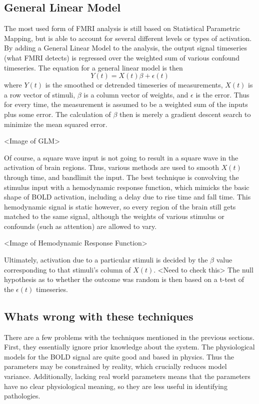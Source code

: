 \documentclass{article}
\begin{document}
\subsection*{General Linear Model}
The most used form of FMRI analysis is still based on Statistical Parametric
Mapping, but is able to account for several different levels or types
of activation. By adding a General Linear Model to the analysis, the
output signal timeseries (what FMRI detects) is regressed over the weighted
sum of various confound timeseries. The equation for a general linear
model is then
\begin{equation}
Y(t) = X(t)\beta + \epsilon(t)
\end{equation}
where $Y(t)$ is the smoothed or detrended timeseries of measurements,
$X(t)$ is a row vector of stimuli, $\beta$ is a column vector of weights,
and $\epsilon$ is the error. Thus for every time, the measurement is
assumed to be a weighted sum of the inputs plus some error. The calculation
of $\beta$ then is merely a gradient descent search to minimize the
mean squared error. 

<Image of GLM>

Of course, a square wave input is not going to result in a square wave
in the activation of brain regions. Thus, various methods are used to 
smooth $X(t)$ through time, and bandlimit the input. The best technique
is convolving the stimulus input with a hemodynamic response function,
which mimicks the basic shape of BOLD activation, including a delay
due to rise time and fall time. This hemodynamic signal is static however,
so every region of the brain still gets matched to the same signal,
although the weights of various stimulus or confounds (such as attention)
are allowed to vary. 

<Image of Hemodynamic Response Function>

Ultimately, activation due to a particular stimuli is decided by the 
$\beta$ value corresponding to that stimuli's column of $X(t)$.
<Need to check this>
The null hypothesis as to whether the outcome was random is then
based on a t-test of the $\epsilon(t)$ timeseries. 

\subsection*{Whats wrong with these techniques}
There are a few problems with the techniques mentioned in the 
previous sections. First, they essentially ignore prior knowledge about
the system. The physiological models for the BOLD signal are quite good
and based in physics. Thus the parameters may be constrained by reality,
which crucially reduces model variance. Additionally, lacking real world
parameters means that the parameters have no clear physiological meaning,
so they are less useful in identifying pathologies.
\end{document}
